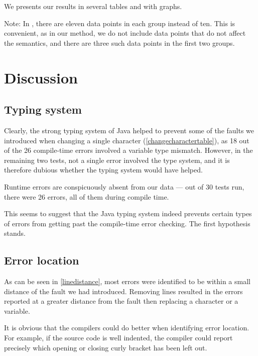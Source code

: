 \documentclass[10pt]{report}
\begin{document}
We presents our results in several tables and with graphs.


Note: In \cite{nugee}, there are eleven data points in each group instead of ten.  This is convenient, as in our method, we do not include data points that do not affect the semantics, and there are three such data points in the first two groups.


\chapter{Discussion}
\thispagestyle{fancy}

\section{Typing system}

Clearly, the strong typing system of Java helped to prevent some of the faults we introduced when changing a single character (\ref{changecharactertable}), as 18 out of the 26 compile-time errors involved a variable type mismatch.  However, in the remaining two tests, not a single error involved the type system, and it is therefore dubious whether the typing system would have helped.

Runtime errors are conspicuously absent from our data --- out of 30 tests run, there were 26 errors, all of them during compile time.

This seems to suggest that the Java typing system indeed prevents certain types of errors from getting past the compile-time error checking.  The first hypothesis stands.

\section{Error location}

As can be seen in \ref{linedistance}, most errors were identified to be within a small distance of the fault we had introduced.  Removing lines resulted in the errors reported at a greater distance from the fault then replacing a character or a variable.

It is obvious that the compilers could do better when identifying error location.  For example, if the source code is well indented, the compiler could report precisely which opening or closing curly bracket has been left out.
\end{document}
